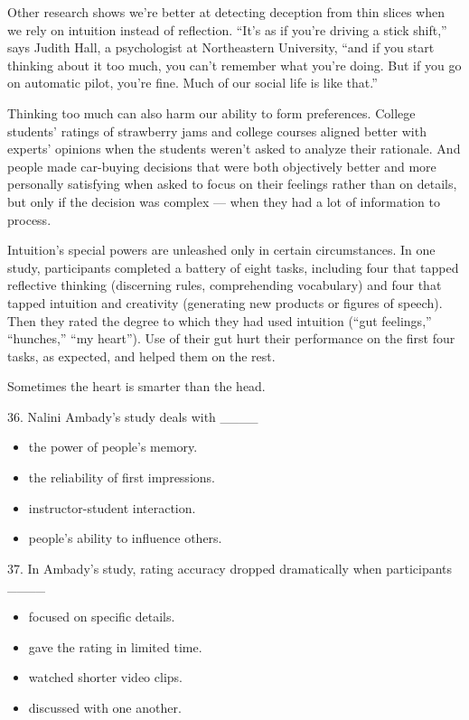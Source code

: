 \documentclass[UTF8,11pt]{ctexart}
\begin{document}
Other research shows we’re better at detecting deception from thin slices when we rely on intuition instead of reflection. “It’s as if you’re driving a stick shift,” says Judith Hall, a psychologist at Northeastern University, “and if you start thinking about it too much, you can’t remember what you’re doing. But if you go on automatic pilot, you’re fine. Much of our social life is like that.”


Thinking too much can also harm our ability to form preferences. College students’ ratings of strawberry jams and college courses aligned better with experts’ opinions when the students weren’t asked to analyze their rationale. And people made car-buying decisions that were both objectively better and more personally satisfying when asked to focus on their feelings rather than on details, but only if the decision was complex — when they had a lot of information to process.


Intuition’s special powers are unleashed only in certain circumstances. In one study, participants completed a battery of eight tasks, including four that tapped reflective thinking (discerning rules, comprehending vocabulary) and four that tapped intuition and creativity (generating new products or figures of speech). Then they rated the degree to which they had used intuition (“gut feelings,” “hunches,” “my heart”). Use of their gut hurt their performance on the first four tasks, as expected, and helped them on the rest.


Sometimes the heart is smarter than the head.


36. Nalini Ambady’s study deals with \_\_\_\_


\begin{itemize}[leftmargin=2em,itemsep=.2em,topsep=.4em]\item[A.] the power of people’s memory.
\item[B.] the reliability of first impressions.
\item[C.] instructor-student interaction.
\item[D.] people’s ability to influence others.
\end{itemize}

37. In Ambady’s study, rating accuracy dropped dramatically when participants \_\_\_\_


\begin{itemize}[leftmargin=2em,itemsep=.2em,topsep=.4em]\item[A.] focused on specific details.
\item[B.] gave the rating in limited time.
\item[C.] watched shorter video clips.
\item[D.] discussed with one another.
\end{itemize}
\end{document}
